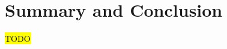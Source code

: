 \graphicspath{{conclusion/fig/}}

\chapter{Summary and Conclusion} \label{chap:conclusion}

\hl{TODO}